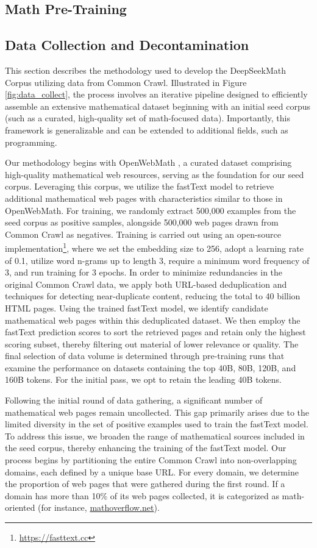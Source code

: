 \begin{itemize}[topsep=0pt]
\section{Math Pre-Training}

\subsection{Data Collection and Decontamination} This section describes the methodology used to develop the DeepSeekMath Corpus utilizing data from Common Crawl. Illustrated in Figure \ref{fig:data_collect}, the process involves an iterative pipeline designed to efficiently assemble an extensive mathematical dataset beginning with an initial seed corpus (such as a curated, high-quality set of math-focused data). Importantly, this framework is generalizable and can be extended to additional fields, such as programming.

Our methodology begins with OpenWebMath \citep{openwebmath}, a curated dataset comprising high-quality mathematical web resources, serving as the foundation for our seed corpus. Leveraging this corpus, we utilize the fastText model \citep{joulin2016fasttext} to retrieve additional mathematical web pages with characteristics similar to those in OpenWebMath. For training, we randomly extract 500,000 examples from the seed corpus as positive samples, alongside 500,000 web pages drawn from Common Crawl as negatives. Training is carried out using an open-source implementation\footnote{\url{https://fasttext.cc}}, where we set the embedding size to 256, adopt a learning rate of 0.1, utilize word n-grams up to length 3, require a minimum word frequency of 3, and run training for 3 epochs. In order to minimize redundancies in the original Common Crawl data, we apply both URL-based deduplication and techniques for detecting near-duplicate content, reducing the total to 40 billion HTML pages. Using the trained fastText model, we identify candidate mathematical web pages within this deduplicated dataset. We then employ the fastText prediction scores to sort the retrieved pages and retain only the highest scoring subset, thereby filtering out material of lower relevance or quality. The final selection of data volume is determined through pre-training runs that examine the performance on datasets containing the top 40B, 80B, 120B, and 160B tokens. For the initial pass, we opt to retain the leading 40B tokens.

Following the initial round of data gathering, a significant number of mathematical web pages remain uncollected. This gap primarily arises due to the limited diversity in the set of positive examples used to train the fastText model. To address this issue, we broaden the range of mathematical sources included in the seed corpus, thereby enhancing the training of the fastText model. Our process begins by partitioning the entire Common Crawl into non-overlapping domains, each defined by a unique base URL. For every domain, we determine the proportion of web pages that were gathered during the first round. If a domain has more than 10\% of its web pages collected, it is categorized as math-oriented (for instance, \url{mathoverflow.net}). 


\end{itemize}

